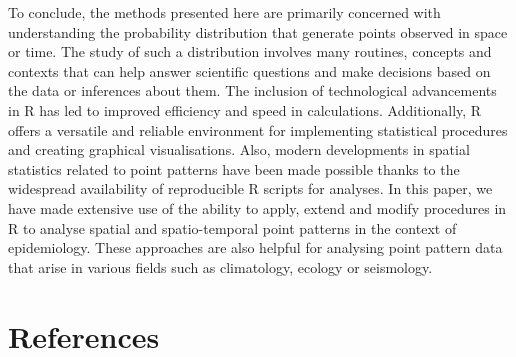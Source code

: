 To conclude, the methods presented here are primarily concerned with understanding the probability distribution that generate points observed in space or time. The study of such a distribution involves many routines, concepts and contexts that can help answer scientific questions and make decisions based on the data or inferences about them. The inclusion of technological advancements in R has led to improved efficiency and speed in calculations. Additionally, R offers a versatile and reliable environment for implementing statistical procedures and creating graphical visualisations. Also, modern developments in spatial statistics related to point patterns have been made possible thanks to the widespread availability of reproducible R scripts for analyses. In this paper, we have made extensive use of the ability to apply, extend and modify procedures in R to analyse spatial and spatio-temporal point patterns in the context of epidemiology. These approaches are also helpful for analysing point pattern data that arise in various fields such as climatology, ecology or seismology.

\hypertarget{references}{%
\section*{References}\label{references}}

